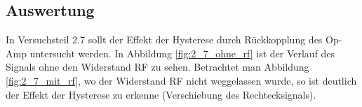 \documentclass[12pt,a4paper]{article}
\begin{document}
\subsection{Auswertung}

In Versuchsteil 2.7 sollt der Effekt der Hysterese durch Rückkopplung des Op-Amp untersucht werden. In Abbildung \ref{fig:2_7_ohne_rf} ist der Verlauf des Signals ohne den Widerstand RF zu sehen. Betrachtet man Abbildung \ref{fig:2_7_mit_rf}, wo der Widerstand RF nicht weggelassen wurde, so ist deutlich der Effekt der Hysterese zu erkenne (Verschiebung des Rechtecksignals).
\end{document}
